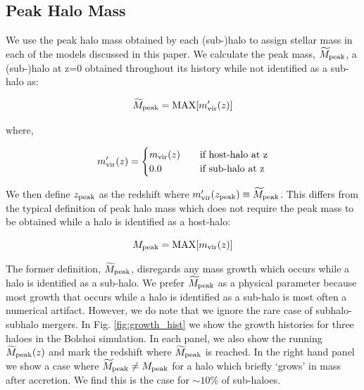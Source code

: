 \documentclass[a4paper,fleqn,usenatbib]{mnras}
\begin{document}
\subsection{Peak Halo Mass}

We use the peak halo mass obtained by each (sub-)halo to assign stellar mass in each of the models discussed in this paper.  We calculate the peak mass, $\widetilde{M}_{\rm peak}$, a (sub-)halo at z=0 obtained throughout its history while not identified as a sub-halo as:
%
\begin{linenomath}
\begin{equation}
\widetilde{M}_{\rm peak} = {\rm MAX}[m^{\prime}_{\rm vir}(z)]
\end{equation}
\end{linenomath}
%
where,
%
\begin{linenomath}
\begin{equation}
m^{\prime}_{\rm vir}(z)= 
\begin{cases}
    m_{\rm vir}(z)   & \quad \text{if host-halo at z}\\
    0.0                   & \quad \text{if sub-halo at z} \\
  \end{cases}
\end{equation}
\end{linenomath}
%
We then define $z_{\rm peak}$ as the redshift where $m^{\prime}_{\rm vir}(z_{\rm peak})\equiv \widetilde{M}_{\rm peak}$.  This differs from the typical definition of peak halo mass which does not require the peak mass to be obtained while a halo is identified as a host-halo:
%
\begin{linenomath}
\begin{equation}
M_{\rm peak} = {\rm MAX}[m_{\rm vir}(z)]
\end{equation}
\end{linenomath}
%
The former definition, $\widetilde{M}_{\rm peak}$, disregards any mass growth which occurs while a halo is identified as a sub-halo. We prefer $\widetilde{M}_{\rm peak}$ as a physical parameter because most growth that occurs while a halo is identified as a sub-halo is most often a numerical artifact.  However, we do note that we ignore the rare case of subhalo-subhalo mergers.  In Fig. \ref{fig:growth_hist} we show the growth histories for three haloes in the Bolshoi simulation.  In each panel, we also show the running $\widetilde{M}_{\rm peak}(z)$ and mark the redshift where $\widetilde{M}_{\rm peak}$ is reached.  In the right hand panel we show a case where $\widetilde{M}_{\rm peak} \neq {M}_{\rm peak}$ for a halo which briefly `grows' in mass after accretion.  We find this is the case for $\sim 10\%$ of sub-haloes.    
\end{document}
